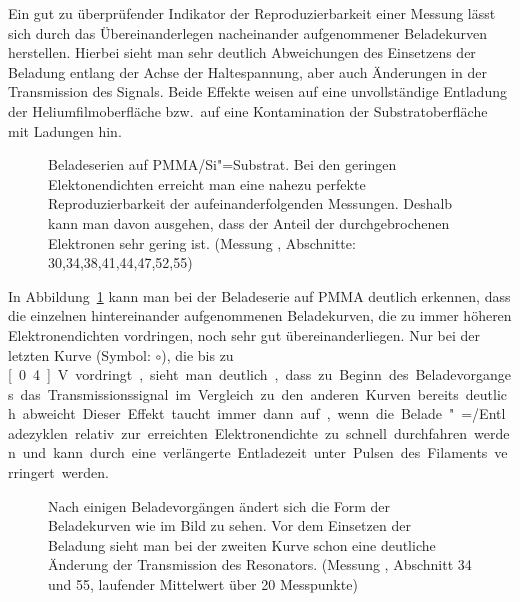 Ein gut zu überprüfender Indikator der Reproduzierbarkeit einer Messung lässt sich durch das Übereinanderlegen nacheinander aufgenommener Beladekurven herstellen. Hierbei sieht man sehr deutlich Abweichungen des Einsetzens der Beladung entlang der Achse der Haltespannung, aber auch Änderungen in der Transmission des Signals. Beide Effekte weisen auf eine unvollständige Entladung der Heliumfilmoberfläche bzw.\ auf eine Kontamination der Substratoberfläche mit Ladungen hin.
\begin{figure}[h!tb]
    \hfill%
    \begin{minipage}[b]{\textwidth-\smidwidth-\tabcolsep}
        \caption[Beladung eines PMMA/Si"=Substrats]{Beladeserien auf PMMA/Si"=Substrat. Bei den geringen Elektonendichten erreicht man eine nahezu perfekte Reproduzierbarkeit der aufeinanderfolgenden Messungen. Deshalb kann man davon ausgehen, dass der Anteil der durchgebrochenen Elektronen sehr gering ist. (Messung , Abschnitte: 30,34,38,41,44,47,52,55)}
        \label{fig:charge_series}
    \end{minipage}
\end{figure}
In Abbildung~\ref{fig:charge_series} kann man bei der Beladeserie auf PMMA deutlich erkennen, dass die einzelnen hintereinander aufgenommenen Beladekurven, die zu immer höheren Elektronendichten vordringen, noch sehr gut übereinanderliegen. Nur bei der letzten Kurve (Symbol: $\circ$), die bis zu \unit[0.4]{V} vordringt, sieht man deutlich, dass zu Beginn des Beladevorganges das Transmissionssignal im Vergleich zu den anderen Kurven bereits deutlich abweicht. Dieser Effekt taucht immer dann auf, wenn die Belade"=/Entladezyklen relativ zur erreichten Elektronendichte zu schnell durchfahren werden und kann durch eine verlängerte Entladezeit unter Pulsen des Filaments verringert werden.
\begin{figure}[h!tbp]
    \begin{center}
    \end{center}
    \caption[Einfluss wiederholter Beladevorgänge auf das Aussehen der Messkurven]{Nach einigen Beladevorgängen ändert sich die Form der Beladekurven wie im Bild zu sehen. Vor dem Einsetzen der Beladung sieht man bei der zweiten Kurve schon eine deutliche Änderung der Transmission des Resonators. (Messung , Abschnitt 34 und 55, laufender Mittelwert über 20 Messpunkte)}
    \label{fig:pmma_reproduce}
\end{figure}

